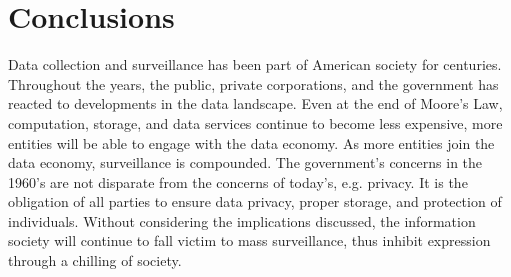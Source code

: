 \section{Conclusions}
Data collection and surveillance has been part of American society for
centuries. Throughout the years, the public, private corporations, and the
government has reacted to developments in the data landscape. Even at the end
of Moore's Law, computation, storage, and data services continue to become less
expensive, more entities will be able to engage with the data economy. As more
entities join the data economy, surveillance is compounded. The government's
concerns in the 1960's are not disparate from the concerns of today's, e.g.
privacy. It is the obligation of all parties to ensure data privacy, proper
storage, and protection of individuals. Without considering the implications
discussed, the information society will continue to fall victim to mass
surveillance, thus inhibit expression through a chilling of society.
